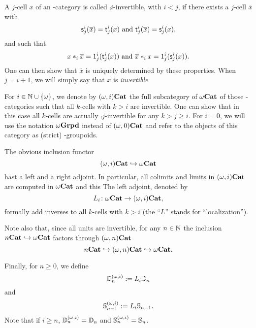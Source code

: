 \documentclass{amsart}
\newcommand{\src}[1]{\source{} #1}
\newcommand{\tgt}[1]{\target{} #1}
\newcommand{\inv}[1]{L_{#1}} %
\begin{document}
\begin{paragr}
  A $j$\nbd-cell $x$ of an \oo-category is called
  $\comp{i}$\nbd-invertible, with $i<j$, if there exists a
  $j$\nbd-cell $\overline{x}$ with
  \[
    \src^i_j(\overline{x})=\tgt^i_j(x) \text{ and } \tgt^i_j(\overline{x})=\src^i_j(x),
  \]
  and such that
  \[
    x\comp{i}\overline{x}=\unit{i}{j}(\tgt^i_j(x)) \text{ and } \overline{x}\comp{i}x=\unit{i}{j}(\src^i_j(x)).
  \]
  One can then show that $\overline{x}$ is uniquely determined by
  these properties. When $j=i+1$, we will simply say that $x$ is
  \emph{invertible}.

  For $i \in \mathbb N \cup \left\{\omega\right\}$, we denote by $(\omega,i)\mathbf{Cat}$ the full
  subcategory of ${\omega}\mathbf{Cat}$ of those \oo-categories such that all
  $k$\nbd-cells with $k>i$ are invertible. One can show that in this
  case all $k$\nbd-cells are actually
  $\comp{j}$\nbd-invertible for any $k > j \geq i$. For $i=0$, we will use the notation ${\omega}\mathbf{Grpd}$ instead of $(\omega,0)\mathbf{Cat}$
  and refer to the objects of this category as (strict) \oo-groupoids.

  The obvious inclusion functor
  \[
    (\omega,i)\mathbf{Cat} \hookrightarrow {\omega}\mathbf{Cat}
  \]
  hast a left and a right adjoint. In particular, all colimits and
  limits in $(\omega,i)\mathbf{Cat}$ are computed in ${\omega}\mathbf{Cat}$ and this  The left adjoint, denoted by
  \[
    \inv{i} \colon \oCat \to \opCat{i},
  \]
  formally add inverses to all $k$\nbd-cells with $k>i$ (the ``$L$''
  stands for ``localization'').

  Note also that, since all units are invertible, for any $n\in \mathbb N$ the inclusion ${n}\mathbf{Cat} \hookrightarrow {\omega}\mathbf{Cat}$
  factors through $(\omega,n)\mathbf{Cat}$
  \[
    {n}\mathbf{Cat} \hookrightarrow (\omega,n)\mathbf{Cat} \hookrightarrow {\omega}\mathbf{Cat}.
  \]

  Finally, for $n\geq 0$, we define
  \[
    \mathbb{D}_{n}^{(\omega,i)}:=L_i\mathbb{D}_{n}
  \]
  and
  \[
    \mathbb{S}_{n-1}^{(\omega,i)}:=L_i\mathbb{S}_{n-1}.
  \]
  Note that if $i \geq n$, $\mathbb{D}_{n}^{(\omega,i)}=\mathbb{D}_{n}$ and $\mathbb{S}_{n}^{(\omega,i)}=\mathbb{S}_{n}$.
\end{paragr}
\end{document}
